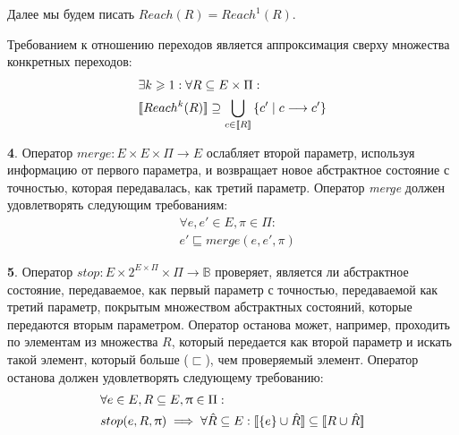 Далее мы будем писать $Reach(R) = Reach^1(R)$. 

Требованием к отношению переходов является аппроксимация сверху множества конкретных переходов:
\begin{equation}
\label{cpa_transfer_eq}
\begin{aligned}
& \exists k \geqslant 1: \forall R \subseteq E \times \Pi:\\
& [\![ Reach^k(R) ]\!] \supseteq \bigcup_{c \in [\![ R ]\!]}{\{c' \mid c \longrightarrow c'\}} \\
\end{aligned}
\end{equation}


{\textbf 4.} Оператор $merge: E \times E \times \Pi \rightarrow E$ ослабляет второй параметр, используя информацию от первого параметра, и возвращает новое абстрактное состояние с точностью, которая передавалась, как третий параметр.
Оператор \emph{merge} должен удовлетворять следующим требованиям:
\begin{equation}
\label{cpa_merge_eq}
\begin{aligned}
&\forall e, e' \in E, \pi \in \Pi :\\
&e' \sqsubseteq merge(e, e', \pi)
\end{aligned}
\end{equation}

{\textbf 5.} Оператор $stop: E \times 2^{E \times \Pi} \times \Pi \rightarrow \mathbb{B}$ проверяет, является ли абстрактное состояние, передаваемое, как первый параметр с точностью, передаваемой как третий параметр, покрытым множеством абстрактных состояний, которые передаются вторым параметром.
Оператор останова может, например, проходить по элементам из множества $R$, который передается как второй параметр и искать такой элемент, который больше ($\sqsubset$), чем проверяемый элемент.
Оператор останова должен удовлетворять следующему требованию:
\begin{equation}
\label{cpa_stop_eq}
\begin{aligned}
&\forall e \in E, R \subseteq E, \uppi \in \Pi:\\
&stop(e, R, \uppi) \implies\forall \hat R \subseteq E: [\![ \{e\}\cup \hat R ]\!] \subseteq [\![ R \cup \hat R ]\!]
\end{aligned}
\end{equation}

